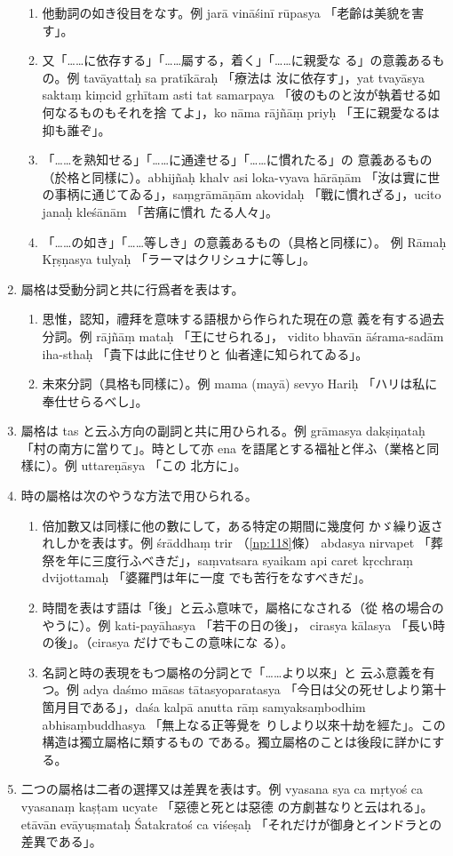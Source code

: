 \begin{enumerate}[label=(\arabic*)]
\begin{enumerate}[label=(\alph*)]
\item 他動詞の如き役目をなす。例 jarā vināśinī rūpasya
「老齡は美貌を害す」。
\item 又「……に依存する」「……屬する，着く」「……に親愛な
る」の意義あるもの。例 tavāyattaḥ sa pratīkāraḥ 「療法は
汝に依存す」，yat tvayāsya saktaṃ kiṃcid gṛhītam asti tat
samarpaya 「彼のものと汝が執着せる如何なるものもそれを捨
てよ」，ko nāma rājñāṃ priyḥ 「王に親愛なるは抑も誰ぞ」。
\item 「……を熟知せる」「……に通達せる」「……に慣れたる」の
意義あるもの（於格と同樣に）。abhijñaḥ khalv asi loka-vyava\-%
hārāṇām 「汝は實に世の事柄に通じてゐる」，saṃgrāmāṇām
akovidaḥ 「戰に慣れざる」，ucito janaḥ kleśānām 「苦痛に慣れ
たる人々」。
\item 「……の如き」「……等しき」の意義あるもの（具格と同樣に）。
例 Rāmaḥ Kṛṣṇasya tulyaḥ 「ラーマはクリシュナに等し」。
\end{enumerate}
\item 屬格は受動分詞と共に行爲者を表はす。
\begin{enumerate}[label=(\alph*)]
\item 思惟，認知，禮拜を意味する語根から作られた現在の意
義を有する過去分詞。例 rājñāṃ mataḥ 「王にせられる」，
vidito bhavān āśrama-sadām iha-sthaḥ 「貴下は此に住せりと
仙者達に知られてゐる」。
\item 未來分詞（具格も同樣に）。例 mama (mayā) sevyo
Hariḥ 「ハリは私に奉仕せらるべし」。
\end{enumerate}
\item 屬格は tas と云ふ方向の副詞と共に用ひられる。例
grāmasya dakṣiṇataḥ 「村の南方に當りて」。時として亦 ena
を語尾とする福祉と伴ふ（業格と同樣に）。例 uttareṇāsya 「この
北方に」。
\item 時の屬格は次のやうな方法で用ひられる。
\begin{enumerate}[label=(\alph*)]
\item 倍加數又は同樣に他の數にして，ある特定の期間に幾度何
かゞ繰り返されしかを表はす。例 śrāddhaṃ trir （\ref{np:118}條）
abdasya nirvapet 「葬祭を年に三度行ふべきだ」，saṃvatsara\-%
syaikam api caret kṛcchraṃ dvijottamaḥ 「婆羅門は年に一度
でも苦行をなすべきだ」。
\item 時間を表はす語は「後」と云ふ意味で，屬格になされる（從
格の場合のやうに）。例 kati-payāhasya 「若干の日の後」，
cirasya kālasya 「長い時の後」。（cirasya だけでもこの意味にな
る）。
\item 名詞と時の表現をもつ屬格の分詞とで「……より以來」と
云ふ意義を有つ。例 adya daśmo māsas tātasyoparatasya
「今日は父の死せしより第十箇月目である」，daśa kalpā anutta\-%
rāṃ samyaksaṃbodhim abhisaṃbuddhasya 「無上なる正等覺を
りしより以來十劫を經た」。この構造は獨立屬格に類するもの
である。獨立屬格のことは後段に詳かにする。
\end{enumerate}
\item 二つの屬格は二者の選擇又は差異を表はす。例 vyasana\-%
sya ca mṛtyoś ca vyasanaṃ kaṣṭam ucyate 「惡德と死とは惡德
の方劇甚なりと云はれる」。etāvān evāyuṣmataḥ Śatakratoś ca
viśeṣaḥ 「それだけが御身とインドラとの差異である」。
\end{enumerate}

